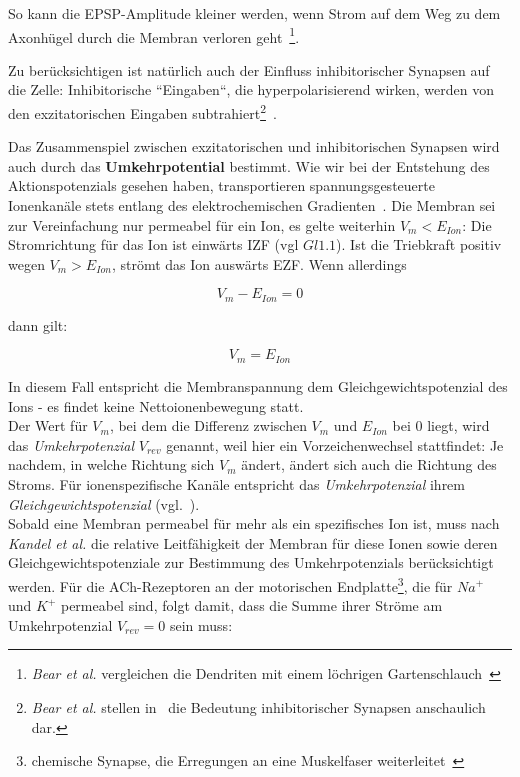{{So kann die EPSP-Amplitude kleiner werden, wenn Strom auf dem Weg zu dem Axonhügel durch die Membran verloren geht~\cite[142 f.]{BCP18}\footnote{
 \textit{Bear et al.} vergleichen die Dendriten mit einem löchrigen Gartenschlauch~\cite[143]{BCP18}
}.

Zu berücksichtigen ist natürlich auch der Einfluss inhibitorischer Synapsen auf die Zelle: Inhibitorische ``Eingaben``, die hyperpolarisierend wirken, werden von den exzitatorischen Eingaben subtrahiert\footnote{
 \textit{Bear et al.} stellen in~\cite[146, Exkurs 5.6]{BCP18} die Bedeutung inhibitorischer Synapsen anschaulich dar.
}~\cite[225]{KSJ+13}.


Das Zusammenspiel zwischen exzitatorischen und inhibitorischen Synapsen wird auch durch das \textbf{Umkehrpotential} bestimmt. 
Wie wir bei der Entstehung des Aktionspotenzials gesehen haben, transportieren spannungsgesteuerte Ionenkanäle stets entlang des elektrochemischen Gradienten~\cite[39]{Fak19}.
Die Membran sei zur Vereinfachung nur permeabel für ein Ion, es gelte weiterhin $V_m < E_{Ion}$: Die Stromrichtung für das Ion ist einwärts IZF (vgl $Gl1.1$). Ist die Triebkraft positiv wegen $V_m > E_{Ion}$, strömt das Ion auswärts EZF. Wenn allerdings

\begin{equation}
V_m - E_{Ion} = 0
\end{equation}

dann gilt:

\begin{equation}
V_m = E_{Ion}
\end{equation}

In diesem Fall entspricht die Membranspannung dem Gleichgewichtspotenzial des Ions - es findet keine Nettoionenbewegung statt.\\

Der Wert für $V_m$, bei dem die Differenz zwischen $V_m$ und $E_{Ion}$ bei $0$ liegt, wird das \textit{Umkehrpotenzial} $V_{rev}$ genannt, weil hier ein Vorzeichenwechsel stattfindet: Je nachdem, in welche Richtung sich $V_m$ ändert, ändert sich auch die Richtung des Stroms.
Für ionenspezifische Kanäle entspricht das \textit{Umkehrpotenzial} ihrem \textit{Gleichgewichtspotenzial} (vgl.~\cite[95 f.]{SBB+13}).\\

Sobald eine Membran permeabel für mehr als ein spezifisches Ion ist, muss nach \textit{Kandel et al.} die relative Leitfähigkeit der Membran für diese Ionen sowie deren Gleichgewichtspotenziale zur Bestimmung des Umkehrpotenzials berücksichtigt werden.
Für die ACh-Rezeptoren an der motorischen Endplatte\footnote{
 chemische Synapse, die Erregungen an eine Muskelfaser weiterleitet~\cite[56]{SD07}
}, die für $Na^+$ und $K^+$ permeabel sind, folgt damit, dass die Summe ihrer Ströme am Umkehrpotenzial $V_{rev} = 0$ sein muss:

}}

